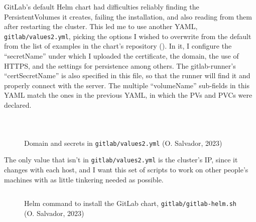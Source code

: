\documentclass[11pt]{article}
\begin{document}
\begin{flushleft}
    GitLab's default Helm chart had difficulties reliably finding the PersistentVolumes it creates, failing the installation, and also reading from them after restarting the cluster. This led me to use another YAML, \texttt{gitlab/values2.yml}, picking the options I wished to overwrite from the default from the list of examples in the chart's repository (\cite{gitlabchart}). In it, I configure the ``secretName'' under which I uploaded the certificate, the domain, the use of HTTPS, and the settings for persistence among others. The gitlab-runner's ``certSecretName'' is also specified in this file, so that the runner will find it and properly connect with the server. The multiple ``volumeName'' sub-fields in this YAML match the ones in the previous YAML, in which the PVs and PVCs were declared. 
    \linebreak

        \begin{figure}[htb]
            \centering
            \begin{subfigure}{.7\textwidth}
                \hspace{-5cm}
                \inputminted[fontsize=\scriptsize, firstline=2, lastline=2, linenos, frame=single, tabsize=1]{bash}{../../gitlab/values2.yml}
                \vspace{-.5cm}
                \inputminted[fontsize=\scriptsize, firstline=8, lastline=16, linenos, frame=single, tabsize=1]{bash}{../../gitlab/values2.yml}
                \vspace{-.6cm}
                \inputminted[fontsize=\scriptsize, firstline=25, lastline=28, linenos, frame=single, tabsize=1]{bash}{../../gitlab/values2.yml}
              \end{subfigure}
            \caption{Domain and secrets in \texttt{gitlab/values2.yml} (O. Salvador, 2023)}
        \end{figure}

    The only value that isn't in \texttt{gitlab/values2.yml} is the cluster's IP, since it changes with each host, and I want this set of scripts to work on other people's machines with as little tinkering needed as possible. 
    \linebreak
    
        \begin{figure}[htb]
            \centering
            \begin{subfigure}{.7\textwidth}
                \hspace{-5cm}
                \inputminted[fontsize=\scriptsize, firstline=31, lastline=32, linenos, frame=single, tabsize=1]{bash}{../../gitlab/gitlab-helm.sh}
              \end{subfigure}
            \caption{Helm command to install the GitLab chart, \texttt{gitlab/gitlab-helm.sh} (O. Salvador, 2023)}
        \end{figure}


\end{flushleft}
\end{document}
